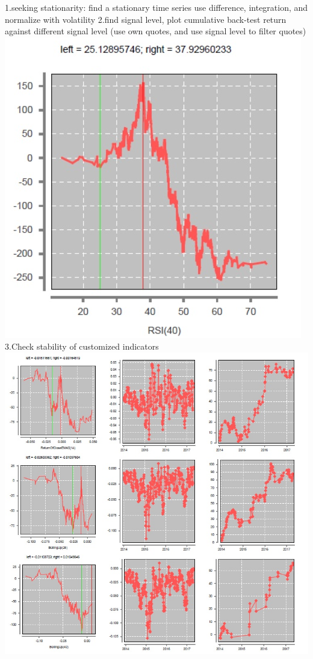 \documentclass[11pt, openany]{book}              %
\begin{document}
1.seeking stationarity: find a stationary time series
	use difference, integration, and normalize with volatility 
2.find signal level, plot cumulative back-test return against different signal level (use own quotes, and use signal level to filter quotes)
\includegraphics[scale=0.5]{7.JPG}
3.Check stability of customized indicators 
\includegraphics[scale=0.5]{8.JPG}
\end{document}

